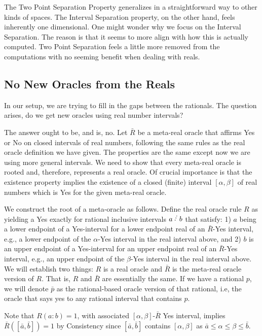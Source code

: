 \documentclass[12pt]{article}
\begin{document}
The Two Point Separation Property generalizes in a straightforward way to other kinds of spaces. The Interval Separation property, on the other hand, feels inherently one dimensional. One might wonder why we focus on the Interval Separation. The reason is that it seems to more align with how this is actually computed. Two Point Separation feels a little more removed from the computations with no seeming benefit when dealing with reals. 


\subsection{No New Oracles from the Reals}

In our setup, we are trying to fill in the gaps between the rationals. The question arises, do we get new oracles using real number intervals? 

The answer ought to be, and is, no. Let $\bar{R}$ be a meta-real oracle that affirms Yes or No on closed intervals of real numbers, following the same rules as the real oracle definition we have given. The properties are the same except now we are using more general intervals. We need to show that every meta-real oracle is rooted and, therefore, represents a real oracle. Of crucial importance is that the existence property implies the existence of a closed (finite) interval $[\alpha, \beta]$ of real numbers which is Yes for the given meta-real oracle. 

We construct the root of a meta-oracle as follows. Define the real oracle rule $R$ as yielding a Yes exactly for rational inclusive intervals $a\lte b$ that satisfy: 1) $a$ being a lower endpoint of a Yes-interval for a lower endpoint real of an $\bar{R}$-Yes interval, e.g., a lower endpoint of the $\alpha$-Yes interval in the real interval above,  and 2) $b$ is an upper endpoint of a Yes-interval for an upper endpoint real of an $\bar{R}$-Yes interval, e.g., an upper endpoint of the $\beta$-Yes interval in the real interval above. We will establish two things: $R$ is a real oracle and $\bar{R}$ is the meta-real oracle version of $R$. That is, $R$ and $\bar{R}$ are essentially the same. If we have a rational $p$, we will denote $\bar{p}$ as the rational-based oracle version of that rational, i.e, the oracle that says yes to any rational interval that contains $p$. 

Note that $R(a:b) = 1$, with associated $[\alpha, \beta]$-$\bar{R}$ Yes interval, implies $\bar{R}([\bar{a}, \bar{b}]) = 1$ by Consistency since $[\bar{a}, \bar{b}]$ contains $[\alpha, \beta]$ as $\bar{a} \leq \alpha \leq \beta \leq \bar{b}$.
\end{document}
